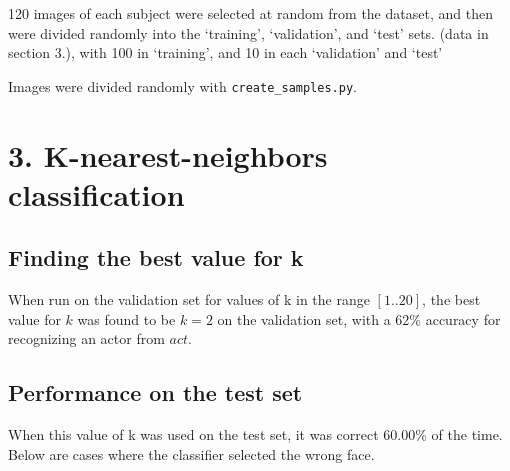 \documentclass[]{article}
\begin{document}
120 images of each subject were selected at random from the dataset, and
then were divided randomly into the `training', `validation', and `test'
sets. (data in section 3.), with 100 in `training', and 10 in each
`validation' and `test'

Images were divided randomly with \texttt{create\_samples.py}.

\section{3. K-nearest-neighbors
classification}\label{k-nearest-neighbors-classification}

\subsection{Finding the best value for
k}\label{finding-the-best-value-for-k}

When run on the validation set for values of k in the range
\([1 .. 20]\), the best value for \(k\) was found to be \(k=2\) on the
validation set, with a \(62\)\% accuracy for recognizing an actor from
\(act\).

\subsection{Performance on the test
set}\label{performance-on-the-test-set}

When this value of k was used on the test set, it was correct
\(60.00\)\% of the time. Below are cases where the classifier selected
the wrong face.
\end{document}
